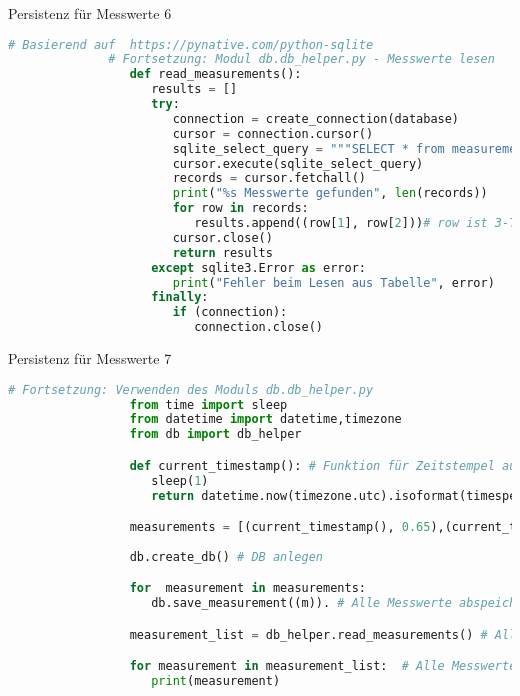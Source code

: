 \begin{frame}[fragile]{Persistenz für Messwerte 6}
       \begin{lstlisting}[language=Python, gobble=8]
              # Basierend auf  https://pynative.com/python-sqlite
              # Fortsetzung: Modul db.db_helper.py - Messwerte lesen
                 def read_measurements():
                    results = []
                    try:
                       connection = create_connection(database)
                       cursor = connection.cursor()
                       sqlite_select_query = """SELECT * from measurements"""
                       cursor.execute(sqlite_select_query)
                       records = cursor.fetchall()
                       print("%s Messwerte gefunden", len(records))
                       for row in records:
                          results.append((row[1], row[2]))# row ist 3-Tupel (ID, Zeitstempel, Messwert)
                       cursor.close()
                       return results
                    except sqlite3.Error as error:
                       print("Fehler beim Lesen aus Tabelle", error)
                    finally:
                       if (connection):
                          connection.close()
       \end{lstlisting}

\end{frame}

\begin{frame}[fragile]{Persistenz für Messwerte 7}
       \begin{lstlisting}[language=Python, gobble=8]
              # Fortsetzung: Verwenden des Moduls db.db_helper.py
                 from time import sleep
                 from datetime import datetime,timezone
                 from db import db_helper

                 def current_timestamp(): # Funktion für Zeitstempel aus CSV Beispiel
                    sleep(1)
                    return datetime.now(timezone.utc).isoformat(timespec='milliseconds')

                 measurements = [(current_timestamp(), 0.65),(current_timestamp(), 0.7),(current_timestamp(), 0.98) ] # Messungen als Tupel
                 
                 db.create_db() # DB anlegen

                 for  measurement in measurements:  
                    db.save_measurement((m)). # Alle Messwerte abspeichern

                 measurement_list = db_helper.read_measurements() # Alle Messwerte laden

                 for measurement in measurement_list:  # Alle Messwerte ausgeben
                    print(measurement)
       \end{lstlisting}

\end{frame}